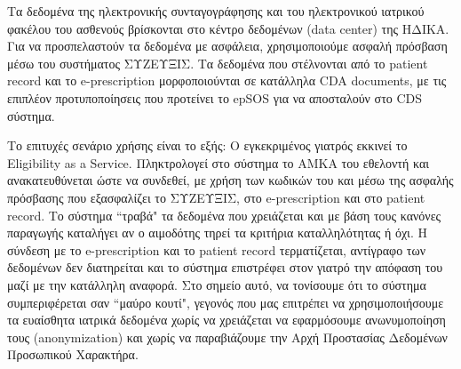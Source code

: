 		
		
		Τα δεδομένα της ηλεκτρονικής συνταγογράφησης και του ηλεκτρονικού ιατρικού φακέλου του ασθενούς βρίσκονται στο κέντρο δεδομένων (data center) της ΗΔΙΚΑ. Για να προσπελαστούν τα δεδομένα με ασφάλεια, χρησιμοποιούμε ασφαλή πρόσβαση μέσω του συστήματος ΣΥΖΕΥΞΙΣ. Τα δεδομένα που στέλνονται από το patient record και το e-prescription μορφοποιούνται σε κατάλληλα CDA documents, με τις επιπλέον προτυποποίησεις που προτείνει το epSOS για να αποσταλούν στο CDS σύστημα.
		
		Το επιτυχές σενάριο χρήσης είναι το εξής: Ο εγκεκριμένος γιατρός εκκινεί το Eligibility as a Service. Πληκτρολογεί στο σύστημα το ΑΜΚΑ του εθελοντή και ανακατευθύνεται ώστε να συνδεθεί, με χρήση των κωδικών του και μέσω της ασφαλής πρόσβασης που εξασφαλίζει το ΣΥΖΕΥΞΙΣ, στο e-prescription και στο patient record. Το σύστημα ``τραβά" τα δεδομένα που χρειάζεται και με βάση τους κανόνες παραγωγής καταλήγει αν ο αιμοδότης τηρεί τα κριτήρια καταλληλότητας ή όχι. Η σύνδεση με το e-prescription και το patient record τερματίζεται, αντίγραφο των δεδομένων δεν διατηρείται και το σύστημα επιστρέφει στον γιατρό την απόφαση του μαζί με την κατάλληλη αναφορά. Στο σημείο αυτό, να τονίσουμε ότι το σύστημα συμπεριφέρεται σαν ``μαύρο κουτί", γεγονός που μας επιτρέπει να χρησιμοποιήσουμε τα ευαίσθητα ιατρικά δεδομένα χωρίς να χρειάζεται να εφαρμόσουμε ανωνυμοποίηση τους (anonymization) και χωρίς να παραβιάζουμε την Αρχή Προστασίας Δεδομένων Προσωπικού Χαρακτήρα. 
		
		
		
		
		
		
		
		
		
		
		
		
		
